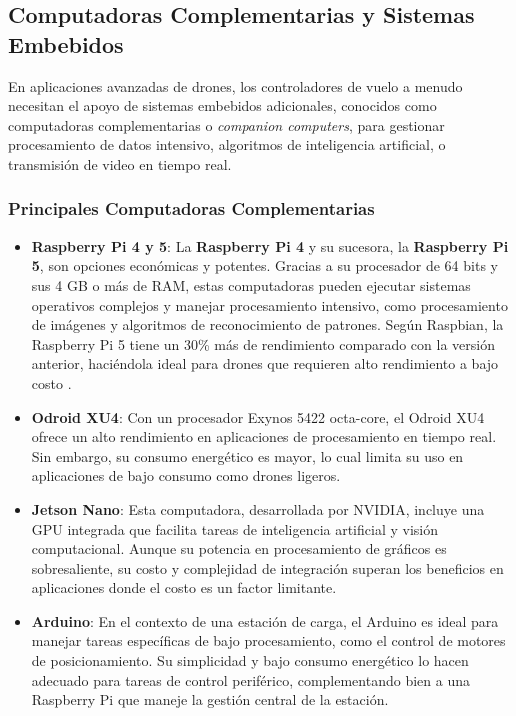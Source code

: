 \subsection{Computadoras Complementarias y Sistemas Embebidos}

En aplicaciones avanzadas de drones, los controladores de vuelo a menudo necesitan el apoyo de sistemas embebidos adicionales, conocidos como computadoras complementarias o \textit{companion computers}, para gestionar procesamiento de datos intensivo, algoritmos de inteligencia artificial, o transmisión de video en tiempo real.

\subsubsection{Principales Computadoras Complementarias}
\begin{itemize}
    \item \textbf{Raspberry Pi 4 y 5}: La \textbf{Raspberry Pi 4} y su sucesora, la \textbf{Raspberry Pi 5}, son opciones económicas y potentes. Gracias a su procesador de 64 bits y sus 4 GB o más de RAM, estas computadoras pueden ejecutar sistemas operativos complejos y manejar procesamiento intensivo, como procesamiento de imágenes y algoritmos de reconocimiento de patrones. Según Raspbian, la Raspberry Pi 5 tiene un 30\% más de rendimiento comparado con la versión anterior, haciéndola ideal para drones que requieren alto rendimiento a bajo costo \cite{rasp_docs}.
    \item \textbf{Odroid XU4}: Con un procesador Exynos 5422 octa-core, el Odroid XU4 ofrece un alto rendimiento en aplicaciones de procesamiento en tiempo real. Sin embargo, su consumo energético es mayor, lo cual limita su uso en aplicaciones de bajo consumo como drones ligeros.
    \item \textbf{Jetson Nano}: Esta computadora, desarrollada por NVIDIA, incluye una GPU integrada que facilita tareas de inteligencia artificial y visión computacional. Aunque su potencia en procesamiento de gráficos es sobresaliente, su costo y complejidad de integración superan los beneficios en aplicaciones donde el costo es un factor limitante.
    \item \textbf{Arduino}: En el contexto de una estación de carga, el Arduino es ideal para manejar tareas específicas de bajo procesamiento, como el control de motores de posicionamiento. Su simplicidad y bajo consumo energético lo hacen adecuado para tareas de control periférico, complementando bien a una Raspberry Pi que maneje la gestión central de la estación.
\end{itemize}

